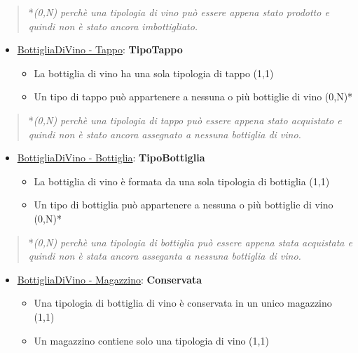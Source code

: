 \begin{verse}
	*\emph{(0,N) perchè una tipologia di vino può essere appena stato prodotto e quindi non è stato ancora imbottigliato.}
\end{verse}

\begin{itemize}
	\item \underline{BottigliaDiVino - Tappo}: \textbf{TipoTappo}
	
	\begin{itemize}
		\item La bottiglia di vino ha una sola tipologia di tappo (1,1)
		\item Un tipo di tappo può appartenere a nessuna o più bottiglie di vino (0,N)*
	\end{itemize}
	
\end{itemize}

\begin{verse}
	*\emph{(0,N) perchè una tipologia di tappo può essere appena stato acquistato e quindi non è stato ancora assegnato a nessuna bottiglia di vino.}
\end{verse}

\begin{itemize}
	\item \underline{BottigliaDiVino - Bottiglia}: \textbf{TipoBottiglia}
	
	\begin{itemize}
		\item La bottiglia di vino è formata da una sola tipologia di bottiglia (1,1)
		\item Un tipo di bottiglia può appartenere a nessuna o più bottiglie di vino (0,N)*
	\end{itemize}
	
\end{itemize}

\begin{verse}
	*\emph{(0,N) perchè una tipologia di bottiglia può essere appena stata acquistata e quindi non è stata ancora asseganta a nessuna bottiglia di vino.}
\end{verse}

\begin{itemize}
	\item \underline{BottigliaDiVino - Magazzino}: \textbf{Conservata}
	
	\begin{itemize}
		\item Una tipologia di bottiglia di vino è conservata in un unico magazzino (1,1)
		\item Un magazzino contiene solo una tipologia di vino (1,1)
	\end{itemize}
	
\end{itemize}

